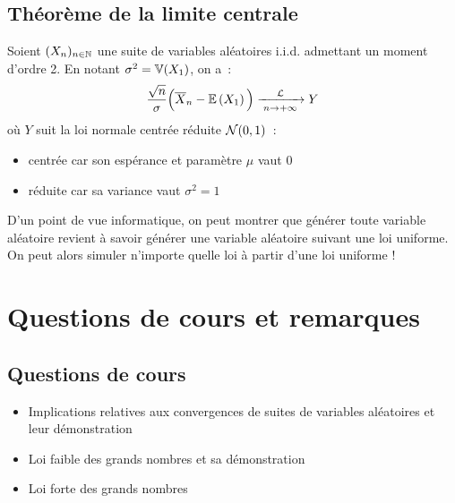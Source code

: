 \subsection{Théorème de la limite centrale}
Soient $(X_n)_{n \in \mathbb{N}}$ une suite de variables aléatoires i.i.d. admettant un moment d'ordre 2. En notant $\sigma^2 = \mathbb{V}(X_1)$, on a~:
$$\frac{\sqrt{n}}{\sigma}\Big(\overline{X}_n - \mathbb{E}\left(X_1\right)\Big) \xrightarrow[\;n \to +\infty\;]{\mathcal{L}} Y$$
où $Y$ suit la loi normale centrée réduite $\mathcal{N}(0,1)$~:
\begin{itemize}
    \item centrée car son espérance et paramètre $\mu$ vaut 0
    \item réduite car sa variance vaut $\sigma^2 = 1$
\end{itemize}


\begin{remarque}{}{}
    D'un point de vue informatique, on peut montrer que générer toute variable aléatoire revient à savoir générer une variable aléatoire suivant une loi uniforme. On peut alors simuler n'importe quelle loi à partir d'une loi uniforme !
\end{remarque}
\section*{Questions de cours et remarques}

\subsection{Questions de cours}
\begin{itemize}
    \item Implications relatives aux convergences de suites de variables aléatoires et leur démonstration
    \item Loi faible des grands nombres et sa démonstration
    \item Loi forte des grands nombres
\end{itemize}


